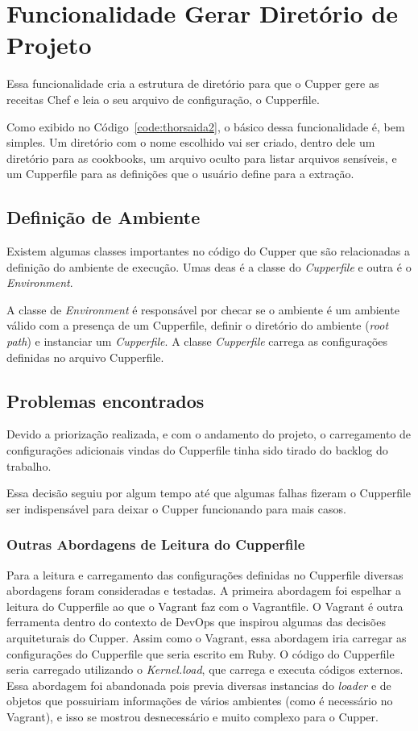\section{Funcionalidade Gerar Diretório de Projeto}
\label{sec:proj}

Essa funcionalidade cria a estrutura de diretório para que o Cupper gere as 
receitas Chef e leia o seu arquivo de configuração, o Cupperfile.

Como exibido no Código~\ref{code:thorsaida2}, o básico dessa funcionalidade é, bem
simples. Um diretório com o nome escolhido vai ser criado, dentro dele um diretório
para as cookbooks, um arquivo oculto para listar arquivos sensíveis, e um 
Cupperfile para as definições que o usuário define para a extração.

\subsection{Definição de Ambiente}
Existem algumas classes importantes no código do Cupper que são relacionadas a
definição do ambiente de execução. Umas deas é a classe do \textit{Cupperfile} e outra
é o \textit{Environment}.

A classe de \textit{Environment} é responsável por checar se o ambiente é um
ambiente válido com a presença de um Cupperfile, definir o diretório do ambiente
(\textit{root\underline{ }path}) e instanciar um \textit{Cupperfile}. A classe \textit{Cupperfile} carrega as configurações definidas no arquivo Cupperfile.

\subsection{Problemas encontrados}
Devido a priorização realizada, e com o andamento do projeto, o carregamento de
configurações adicionais vindas do Cupperfile tinha sido tirado do backlog do
trabalho.

Essa decisão seguiu por algum tempo até que algumas falhas fizeram o Cupperfile
ser indispensável para deixar o Cupper funcionando para mais casos.

\subsubsection{Outras Abordagens de Leitura do Cupperfile}
Para a leitura e carregamento das configurações definidas no Cupperfile diversas
abordagens foram consideradas e testadas. A primeira abordagem foi espelhar a
leitura do Cupperfile ao que o Vagrant faz com o Vagrantfile. O Vagrant é outra
ferramenta dentro do contexto de DevOps que inspirou algumas das decisões arquiteturais
do Cupper. Assim como o Vagrant, essa abordagem iria carregar as configurações
do Cupperfile que seria escrito em Ruby. O código do Cupperfile seria carregado
utilizando o \textit{Kernel.load}, que carrega e executa códigos externos.
Essa abordagem foi abandonada pois previa diversas instancias do \textit{loader}
e de objetos que possuiriam informações de vários ambientes (como é necessário
no Vagrant), e isso se mostrou desnecessário e muito complexo para o Cupper.

